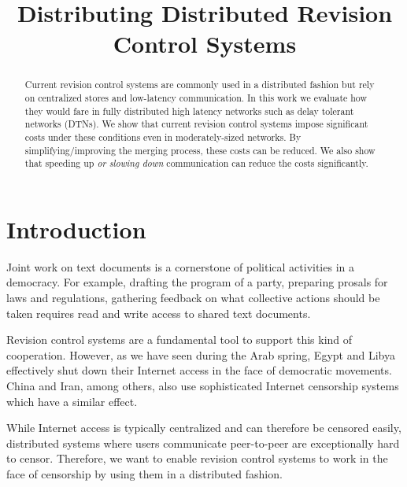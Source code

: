 \documentclass[conference,a4paper]{IEEEtran}
\begin{document}
\title{Distributing Distributed Revision Control Systems}

\author{
\and
{}
}
\maketitle


\begin{abstract}
\boldmath Current revision control systems are commonly used in a distributed fashion but rely on centralized stores and low-latency communication. In this work we evaluate how they would fare in fully distributed high latency networks such as delay tolerant networks (DTNs). We show that current revision control systems impose significant costs under these conditions even in moderately-sized networks. By simplifying/improving the merging process, these costs can be reduced.
We also show that speeding up \textit{or slowing down} communication can reduce the costs significantly.
\end{abstract}

\IEEEpeerreviewmaketitle

\section{Introduction}

Joint work on text documents is a cornerstone of political activities in a democracy. For example, drafting the program of a party, preparing prosals for laws and regulations, gathering feedback on what collective actions should be taken requires read and write access to shared text documents.

Revision control systems are a fundamental tool to support this kind of cooperation. However, as we have seen during the Arab spring, Egypt and Libya effectively shut down their Internet access\cite{outage} in the face of democratic movements. China and Iran, among others, also use sophisticated Internet censorship systems which have a similar effect.

While Internet access is typically centralized and can therefore be censored easily, distributed systems where users communicate peer-to-peer are exceptionally hard to censor. Therefore, we want to enable revision control systems to work in the face of censorship by using them in a distributed fashion.
\end{document}
